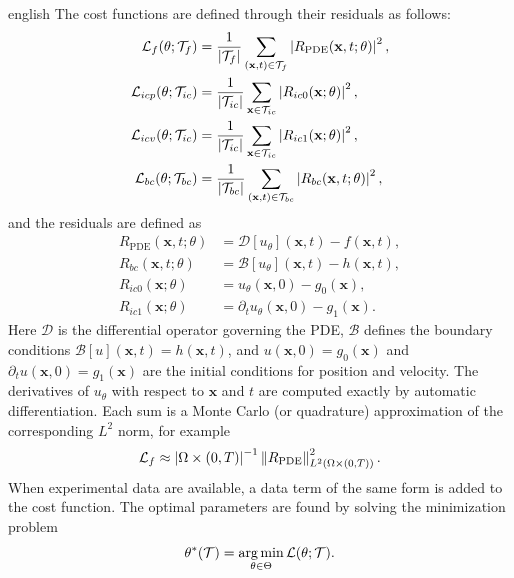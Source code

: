 \documentclass[../0000.tex]{subfiles}
\begin{document}
\begin{hyphenrules}{english}
The cost functions are defined through their residuals as follows:
\begin{align}
  \mathcal{L}_f(\theta;\mathcal{T}_f)&=\frac{1}{\left\lvert \mathcal{T}_f \right\rvert}\sum_{(\mathbf{x},t)\in\mathcal{T}_f}\left\lvert R_{\mathrm{PDE}}(\mathbf{x},t;\theta) \right\rvert^2,\label{eq:loss-f}\\
  \mathcal{L}_{icp}(\theta;\mathcal{T}_{ic})&=\frac{1}{\left\lvert \mathcal{T}_{ic} \right\rvert}\sum_{\mathbf{x}\in\mathcal{T}_{ic}}\left\lvert R_{ic0}(\mathbf{x};\theta) \right\rvert^2,\label{eq:loss-icp}\\
  \mathcal{L}_{icv}(\theta;\mathcal{T}_{ic})&=\frac{1}{\left\lvert \mathcal{T}_{ic} \right\rvert}\sum_{\mathbf{x}\in\mathcal{T}_{ic}}\left\lvert R_{ic1}(\mathbf{x};\theta) \right\rvert^2,\label{eq:loss-icv}\\
  \mathcal{L}_{bc}(\theta;\mathcal{T}_{bc})&=\frac{1}{\left\lvert \mathcal{T}_{bc} \right\rvert}\sum_{(\mathbf{x},t)\in\mathcal{T}_{bc}}\left\lvert R_{bc}(\mathbf{x},t;\theta) \right\rvert^2,\label{eq:loss-bc}
\end{align}
and the residuals are defined as
\begin{align}
  R_{\mathrm{PDE}}(\mathbf{x},t;\theta)&=\mathcal{D}[u_\theta](\mathbf{x},t)-f(\mathbf{x},t), \label{eq:res-pde}\\
  R_{bc}(\mathbf{x},t;\theta)&=\mathcal{B}[u_\theta](\mathbf{x},t)-h(\mathbf{x},t), \label{eq:res-bc}\\
  R_{ic0}(\mathbf{x};\theta)&=u_\theta(\mathbf{x},0)-g_0(\mathbf{x}), \label{eq:res-ic0}\\
  R_{ic1}(\mathbf{x};\theta)&=\partial_t u_\theta(\mathbf{x},0)-g_1(\mathbf{x}). \label{eq:res-ic1}
\end{align}
Here $\mathcal{D}$ is the differential operator governing the PDE, $\mathcal{B}$ defines the boundary
conditions $\mathcal{B}[u](\mathbf{x},t)=h(\mathbf{x},t)$, and $u(\mathbf{x},0)=g_0(\mathbf{x})$ and $\partial_t u(\mathbf{x},0)=g_1(\mathbf{x})$ are the
initial conditions for position and velocity. The derivatives of $u_\theta$ with respect to $\mathbf{x}$ and $t$
are computed exactly by automatic differentiation. Each sum is a Monte Carlo (or quadrature)
approximation of the corresponding $L^2$ norm, for example
\[
  \mathcal{L}_f\approx\left\lvert \Omega\times(0,T) \right\rvert^{-1}\left\lVert R_{\mathrm{PDE}} \right\rVert_{L^2(\Omega\times(0,T))}^2.
\]
When
experimental data are available, a data term of the same form is added to the cost function. The optimal
parameters are found by solving the minimization problem
\begin{equation}
  \theta^{*}(\mathcal{T})=\operatorname*{arg\,min}_{\theta\in\Theta}\mathcal{L}(\theta;\mathcal{T}).
  \label{eq:pinn-argmin}
\end{equation}


\end{hyphenrules}
\end{document}
